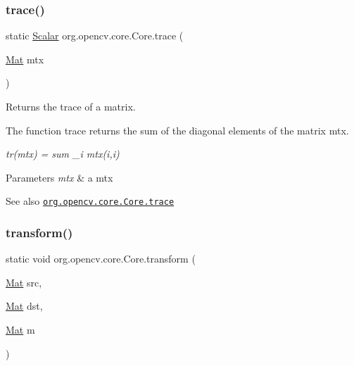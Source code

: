 \mbox{\label{classorg_1_1opencv_1_1core_1_1_core_a9c17a12158c59ea65c662cac491c28c3}} 
\subsubsection{\texorpdfstring{trace()}{trace()}}
{\footnotesize\ttfamily static \mbox{\hyperlink{classorg_1_1opencv_1_1core_1_1_scalar}{Scalar}} org.\+opencv.\+core.\+Core.\+trace (\begin{DoxyParamCaption}\item[{\mbox{\hyperlink{classorg_1_1opencv_1_1core_1_1_mat}{Mat}}}]{mtx }\end{DoxyParamCaption})\hspace{0.3cm}{\ttfamily [static]}}

Returns the trace of a matrix.

The function {\ttfamily trace} returns the sum of the diagonal elements of the matrix {\ttfamily mtx}.

{\itshape tr(mtx) = sum \+\_\+i mtx(i,i)}


\begin{DoxyParams}{Parameters}
{\em mtx} & a mtx\\
\hline
\end{DoxyParams}
\begin{DoxySeeAlso}{See also}
\href{http://docs.opencv.org/modules/core/doc/operations_on_arrays.html#trace}{\tt org.\+opencv.\+core.\+Core.\+trace} 
\end{DoxySeeAlso}
\mbox{\label{classorg_1_1opencv_1_1core_1_1_core_a221e7697d1a57961ee8a843b7aa05b75}} 
\subsubsection{\texorpdfstring{transform()}{transform()}}
{\footnotesize\ttfamily static void org.\+opencv.\+core.\+Core.\+transform (\begin{DoxyParamCaption}\item[{\mbox{\hyperlink{classorg_1_1opencv_1_1core_1_1_mat}{Mat}}}]{src,  }\item[{\mbox{\hyperlink{classorg_1_1opencv_1_1core_1_1_mat}{Mat}}}]{dst,  }\item[{\mbox{\hyperlink{classorg_1_1opencv_1_1core_1_1_mat}{Mat}}}]{m }\end{DoxyParamCaption})\hspace{0.3cm}{\ttfamily [static]}}

